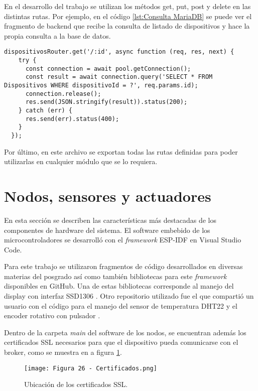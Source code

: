 En el desarrollo del trabajo se utilizan los métodos get, put, post y delete en las distintas rutas. Por ejemplo, en el código \ref{lst:Consulta MariaDB} se puede ver el fragmento de backend que recibe la consulta de listado de dispositivos y hace la propia consulta a la base de datos.

\begin{lstlisting}[caption={Consulta de listado de dispositivos al backend.}, label={lst:Consulta MariaDB}]
dispositivosRouter.get('/:id', async function (req, res, next) {
    try {
      const connection = await pool.getConnection();
      const result = await connection.query('SELECT * FROM Dispositivos WHERE dispositivoId = ?', req.params.id);
      connection.release();
      res.send(JSON.stringify(result)).status(200);
    } catch (err) {
      res.send(err).status(400);
    }
  });
\end{lstlisting}

Por último, en este archivo se exportan todas las rutas definidas para poder utilizarlas en cualquier módulo que se lo requiera.

\section{Nodos, sensores y actuadores}

En esta sección se describen las características más destacadas de los componentes de hardware del sistema. El software embebido de los microcontroladores se desarrolló con el \textit{framework} ESP-IDF \citep{36} en Visual Studio Code.

Para este trabajo se utilizaron fragmentos de código desarrollados en diversas materias del posgrado así como también bibliotecas para este \textit{framework} disponibles en GitHub. Una de estas bibliotecas corresponde al manejo del display con interfaz SSD1306 \citep{37}. Otro repositorio utilizado fue el que compartió un usuario con el código para el manejo del sensor de temperatura DHT22 y el encoder rotativo con pulsador \citep{38}.

Dentro de la carpeta \textit{main} del software de los nodos, se encuentran además los certificados SSL necesarios para que el dispositivo pueda comunicarse con el broker, como se muestra en a figura \ref{fig:26}.

\begin{figure}[h]
\centering
\texttt{[image: Figura 26 - Certificados.png]}
\caption[Ubicación de los certificados SSL]{Ubicación de los certificados SSL.}
\label{fig:26}
\end{figure}

